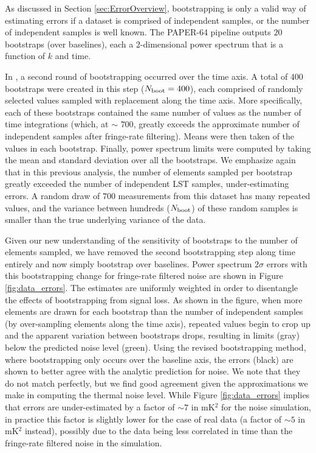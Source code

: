 \documentclass[preprint2,numberedappendix,tighten]{aastex6}
\begin{document}
As discussed in Section \ref{sec:ErrorOverview}, bootstrapping is only a valid way of estimating errors if a dataset is comprised 
of independent samples, or the number of independent samples is well known. The PAPER-64 pipeline outputs $20$ bootstraps (over baselines), each a $2$-dimensional power 
spectrum that is a function of $k$ and time. 

In , a second round of bootstrapping occurred over the time axis. A total of $400$ bootstraps were created in this step 
($N_{\rm boot} = 400$), each comprised of randomly selected values sampled with replacement along the time axis. More 
specifically, each of these bootstraps contained the same number of values as the number of time integrations (which, at $\sim$
$700$, greatly exceeds the approximate number of independent samples after fringe-rate filtering).
Means were then taken of the values in each bootstrap. Finally, power 
spectrum limits were computed by taking the mean and standard deviation over all the bootstraps. We emphasize again that in 
this previous analysis, the number of elements sampled per bootstrap greatly 
exceeded the number of independent LST samples, under-estimating errors. A random draw of $700$ 
measurements from this dataset has many repeated values, and the variance between hundreds ($N_{\rm boot}$) of these random 
samples is smaller than the true underlying variance of the data. 

Given our new understanding of the sensitivity of bootstraps to the number of elements sampled, we have removed the second 
bootstrapping step along time entirely and now simply bootstrap over baselines. Power spectrum $2\sigma$ errors with this bootstrapping change for fringe-rate filtered noise are shown in Figure 
\ref{fig:data_errors}. The estimates are uniformly weighted in order to disentangle the effects of bootstrapping from signal loss. As 
shown in the figure, when more elements are drawn for each bootstrap than the number of 
independent samples (by over-sampling elements along the time axis), repeated values begin to crop up and the apparent variation between bootstraps drops, resulting in limits (gray) below the predicted noise level (green). Using the revised bootstrapping method, where bootstrapping only occurs over the baseline axis, the errors (black) are shown to better agree with the analytic prediction for noise. We note that they do not match perfectly, but we find good agreement given the approximations we make in computing the thermal noise level. While Figure \ref{fig:data_errors} implies that errors are under-estimated by a factor of $\sim$$7$ in mK$^{2}$ for the noise simulation, in practice this factor is slightly lower for the case of real data (a factor of $\sim$$5$ in mK$^{2}$ instead), possibly due to the data being less correlated in time than the fringe-rate filtered noise in the simulation.
\end{document}
